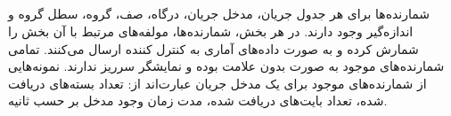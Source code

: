 \subsection{}
شمارنده‌ها برای هر جدول جریان، مدخل جریان، درگاه، صف، گروه، سطل گروه و اندازه‌گیر وجود دارند. در هر بخش، شمارنده‌ها، مولفه‌های مرتبط با آن بخش را شمارش کرده و به صورت داده‌های آماری به کنترل کننده ارسال می‌کنند. تمامی شمارنده‌های موجود به صورت بدون علامت بوده و نمایشگر سرریز ندارند. نمونه‌هایی از شمارنده‌های موجود برای یک مدخل جریان عبارت‌اند از: تعداد بسته‌های دریافت شده، تعداد بایت‌‌های دریافت شده، مدت زمان وجود مدخل بر حسب ثانیه.
